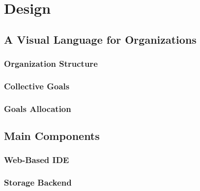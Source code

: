 \chapter{Design}

\section{A Visual Language for Organizations}
\subsection{Organization Structure}
\subsection{Collective Goals}
\subsection{Goals Allocation}

\section{Main Components}
\subsection{Web-Based IDE}
\subsection{Storage Backend}
